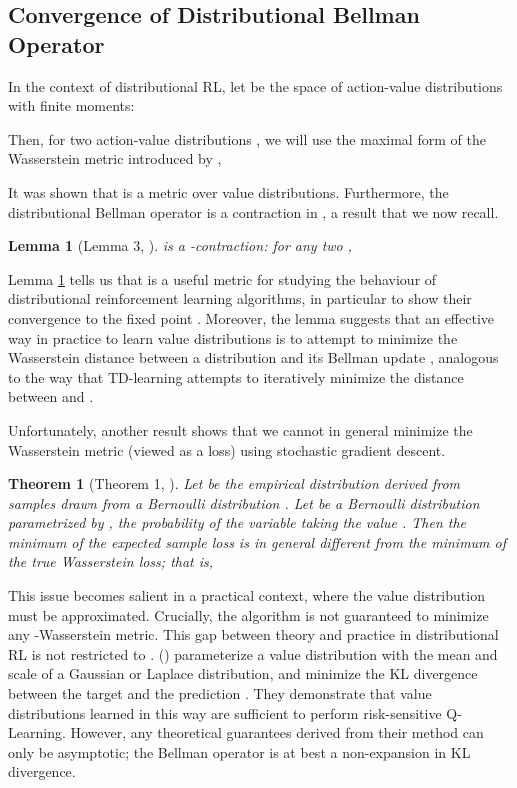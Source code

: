\documentclass[letterpaper]{article}
\newtheorem{lem}{Lemma}
\newtheorem{thm}{Theorem}
\newcommand{\citet}[1]{\citeauthor{#1} (\citeyear{#1})}
\begin{document}
\subsection{Convergence of Distributional Bellman Operator}

In the context of distributional RL, let  be the space of action-value distributions with finite  moments:

Then, for two action-value distributions , we will use the maximal form of the Wasserstein metric introduced by \cite{c51},

It was shown that  is a metric over value distributions. Furthermore, the distributional Bellman operator  is a contraction in , a result that we now recall.
\begin{lem}[Lemma 3, \citeauthor{c51} \citeyear{c51}]\label{lem:wasserstein_contraction_operator}
 is a -contraction: for any two ,

\end{lem}
Lemma \ref{lem:wasserstein_contraction_operator} tells us that  is a useful metric for studying the behaviour of distributional reinforcement learning algorithms, in particular to show their convergence to the fixed point . Moreover, the lemma suggests that an effective way in practice to learn value distributions is to attempt to minimize the Wasserstein distance between a distribution  and its Bellman update , analogous to the way that TD-learning attempts to iteratively minimize the  distance between  and . 

Unfortunately, another result shows that we cannot in general minimize the Wasserstein metric (viewed as a loss) using stochastic gradient descent.
\begin{thm}[Theorem 1, \citeauthor{bellemare17cramer} \citeyear{bellemare17cramer}]\label{thm:biased_gradients}
Let  be the empirical distribution derived from samples  drawn from a Bernoulli distribution . Let  be a Bernoulli distribution parametrized by , the probability of the variable taking the value . Then the minimum of the expected sample loss is in general different from the minimum of the true Wasserstein loss; that is,

\end{thm}
This issue becomes salient in a practical context, where the value distribution must be approximated. Crucially, the  algorithm is not guaranteed to minimize any -Wasserstein metric. This gap between theory and practice in distributional RL is not restricted to . \citet{morimura10parametric} parameterize a value distribution with the mean and scale of a Gaussian or Laplace distribution, and minimize the KL divergence between the target  and the prediction . They demonstrate that value distributions learned in this way are sufficient to perform risk-sensitive Q-Learning. However, any theoretical guarantees derived from their method can only be asymptotic; the Bellman operator is at best a non-expansion in KL divergence.
\end{document}
